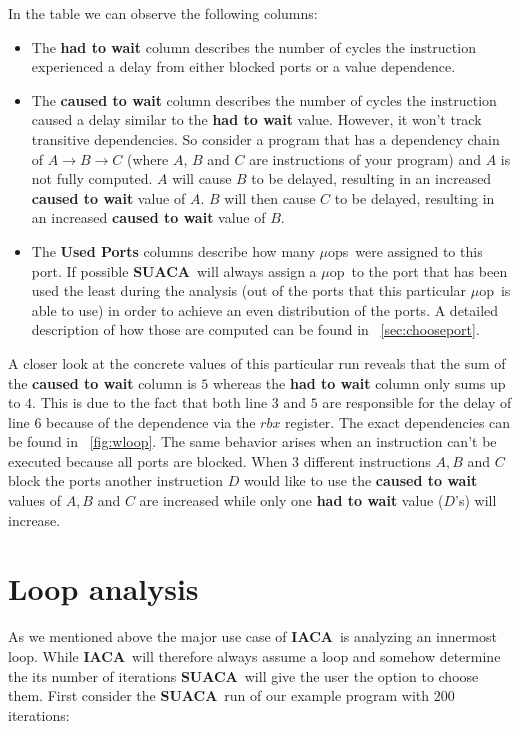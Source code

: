 \documentclass[a4paper,12pt,titlepage, twoside]{report}
\newcommand{\suaca}{\textbf{SUACA}}
\newcommand{\iaca}{\textbf{IACA}}
\newcommand{\microop}{$\mu$op}
\newcommand{\microops}{$\mu$ops}
\begin{document}
In the table we can observe the following columns:
\begin{itemize}
    \item The \textbf{had to wait} column describes the number of cycles the instruction experienced a delay from either blocked ports or a value dependence. 
    \item The \textbf{caused to wait} column describes the number of cycles the instruction caused a delay similar to the \textbf{had to wait} value. However, it won't track transitive dependencies. So consider a program that has a dependency chain of $A \rightarrow B \rightarrow C$ (where $A$, $B$ and $C$ are instructions of your program) and $A$ is not fully computed. $A$ will cause $B$ to be delayed, resulting in an increased \textbf{caused to wait} value of $A$. $B$ will then cause $C$ to be delayed, resulting in an increased \textbf{caused to wait} value of $B$.
    \item The \textbf{Used Ports} columns describe how many \microops\ were assigned to this port. If possible \suaca\ will always assign a \microop\ to the port that has been used the least during the analysis (out of the ports that this particular \microop\ is able to use) in order to achieve an even distribution of the ports. A detailed description of how those are computed can be found in ~\autoref{sec:chooseport}.
\end{itemize}

A closer look at the concrete values of this particular run reveals that the sum of the \textbf{caused to wait} column is $5$ whereas the \textbf{had to wait} column only sums up to $4$. This is due to the fact that both line $3$ and $5$ are responsible for the delay of line $6$ because of the dependence via the $rbx$ register. The exact dependencies can be found in ~\autoref{fig:wloop}. The same behavior arises when an instruction can't be executed because all ports are blocked. When $3$ different instructions $A, B$ and $C$ block the ports another instruction $D$ would like to use the \textbf{caused to wait} values of $A, B$ and $C$ are increased while only one \textbf{had to wait} value ($D$'s) will increase.




\section{Loop analysis}
\label{sec:loop}
As we mentioned above the major use case of \iaca\ is analyzing an innermost loop. While \iaca\ will therefore always assume a loop and somehow determine the its number of iterations \suaca\ will give the user the option to choose them. First consider the \suaca\ run of our example program with $200$ iterations:
\end{document}
